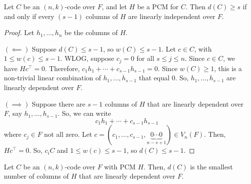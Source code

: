 
\begin{thmbox}
    \begin{theorem}
        Let $ C $ be an $ (n,k) $-code over $ F $, and let $ H $ be a PCM
        for $ C $. Then $ d(C)\geqslant s $ if and only if every $ (s-1) $ columns
        of $ H $ are linearly independent over $ F $.
    \end{theorem} \end{thmbox}

\begin{proof}
    Let $ h_1,\ldots ,h_n $ be the columns of $ H $.

    $ (\impliedby) $ Suppose $ d(C)\leqslant s-1 $, so $ w(C)\leqslant s-1 $.
    Let $ c\in C $, with $ 1\leqslant w(c)\leqslant s-1 $. WLOG, suppose
    $ c_j=0 $ for all $ s\leqslant j\leqslant n $. Since $ c\in C $,
    we have $ Hc^{\top}=0 $. Therefore,
    $ c_1h_1+\cdots+c_{s-1}h_{s-1}=0 $.
    Since $ w(C)\geqslant 1 $, this is a non-trivial linear combination
    of $ h_1,\ldots ,h_{s-1} $ that equal $ 0 $. So,
    $ h_1,\ldots ,h_{s-1} $ are linearly dependent over $ F $.

    $ (\implies) $ Suppose there are $ s-1 $ columns of $ H $ that
    are linearly dependent over $ F $, say $ h_1,\ldots ,h_{s-1} $. So,
    we can write
    \[ c_1h_1+\cdots+c_{s-1}h_{s-1} \]
    where $ c_j\in F $ not all zero. Let $ c=(c_1,\ldots ,c_{s-1},
        \underbrace{0\cdots 0}_{n-s+1})\in V_n(F) $. Then,
    $ Hc^{\top}=0 $. So, $ c_i C $ and $ 1\leqslant w(c)\leqslant s-1 $,
    so $ d(C)\leqslant s-1 $.
\end{proof}

\begin{thmbox}
    \begin{corollary}
        Let $ C $ be an $ (n,k) $-code over $ F $ with PCM $ H $. Then,
        $ d(C) $ is the smallest number of columns of $ H $ that
        are linearly dependent over $ F $.
    \end{corollary} \end{thmbox}

